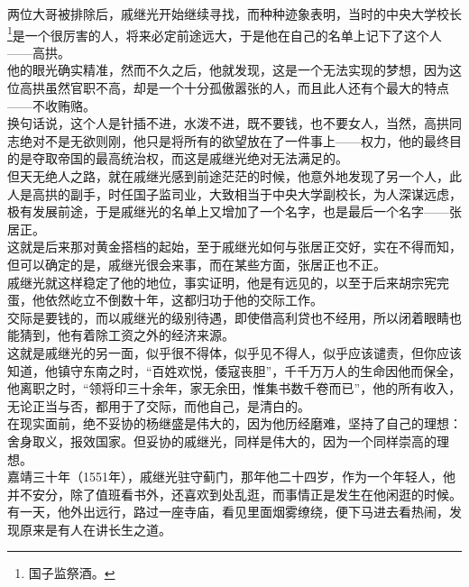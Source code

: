 \begin{multicols}{\theparacolNo}
两位大哥被排除后，戚继光开始继续寻找，而种种迹象表明，当时的中央大学校长\footnote{国子监祭酒。}是一个很厉害的人，将来必定前途远大，于是他在自己的名单上记下了这个人——高拱。\\

他的眼光确实精准，然而不久之后，他就发现，这是一个无法实现的梦想，因为这位高拱虽然官职不高，却是一个十分孤傲嚣张的人，而且此人还有个最大的特点——不收贿赂。\\

换句话说，这个人是针插不进，水泼不进，既不要钱，也不要女人，当然，高拱同志绝对不是无欲则刚，他只是将所有的欲望放在了一件事上——权力，他的最终目的是夺取帝国的最高统治权，而这是戚继光绝对无法满足的。\\

但天无绝人之路，就在戚继光感到前途茫茫的时候，他意外地发现了另一个人，此人是高拱的副手，时任国子监司业，大致相当于中央大学副校长，为人深谋远虑，极有发展前途，于是戚继光的名单上又增加了一个名字，也是最后一个名字——张居正。\\

这就是后来那对黄金搭档的起始，至于戚继光如何与张居正交好，实在不得而知，但可以确定的是，戚继光很会来事，而在某些方面，张居正也不正。\\

戚继光就这样稳定了他的地位，事实证明，他是有远见的，以至于后来胡宗宪完蛋，他依然屹立不倒数十年，这都归功于他的交际工作。\\

交际是要钱的，而以戚继光的级别待遇，即使借高利贷也不经用，所以闭着眼睛也能猜到，他有着除工资之外的经济来源。\\

这就是戚继光的另一面，似乎很不得体，似乎见不得人，似乎应该谴责，但你应该知道，他镇守东南之时，“百姓欢悦，倭寇丧胆”，千千万万人的生命因他而保全，他离职之时，“领将印三十余年，家无余田，惟集书数千卷而已”，他的所有收入，无论正当与否，都用于了交际，而他自己，是清白的。\\

在现实面前，绝不妥协的杨继盛是伟大的，因为他历经磨难，坚持了自己的理想：舍身取义，报效国家。但妥协的戚继光，同样是伟大的，因为一个同样崇高的理想。\\

嘉靖三十年（1551年），戚继光驻守蓟门，那年他二十四岁，作为一个年轻人，他并不安分，除了值班看书外，还喜欢到处乱逛，而事情正是发生在他闲逛的时候。\\

有一天，他外出远行，路过一座寺庙，看见里面烟雾缭绕，便下马进去看热闹，发现原来是有人在讲长生之道。\\


\end{multicols}
